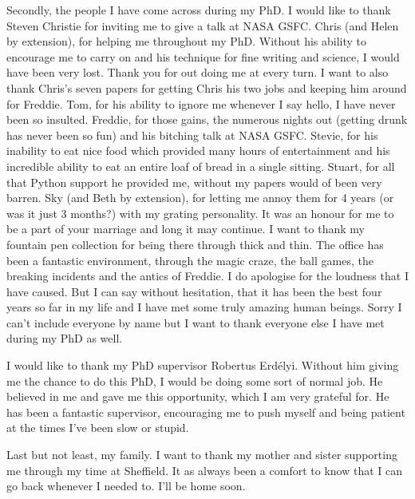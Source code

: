 \begin{acknowledgements}
    Secondly, the people I have come across during my PhD.
    I would like to thank Steven Christie for inviting me to give a talk at NASA GSFC.
    Chris (and Helen by extension), for helping me throughout my PhD.
    Without his ability to encourage me to carry on and his technique for fine writing and science, I would have been very lost.
    Thank you for out doing me at every turn.
    I want to also thank Chris's seven papers for getting Chris his two jobs and keeping him around for Freddie.
    Tom, for his ability to ignore me whenever I say hello, I have never been so insulted.
    Freddie, for those gains, the numerous nights out (getting drunk has never been so fun) and his bitching talk at NASA GSFC.
    Stevie, for his inability to eat nice food which provided many hours of entertainment and his incredible ability to eat an entire loaf of bread in a single sitting. 
    Stuart, for all that Python support he provided me, without my papers would of been very barren.
    Sky (and Beth by extension), for letting me annoy them for 4 years (or was it just 3 months?) with my grating personality.
    It was an honour for me to be a part of your marriage and long it may continue.
    I want to thank my fountain pen collection for being there through thick and thin.
    The office has been a fantastic environment, through the magic craze, the ball games, the breaking incidents and the antics of Freddie. 
    I do apologise for the loudness that I have caused.
    But I can say without hesitation, that it has been the best four years so far in my life and I have met some truly amazing human beings.
    Sorry I can't include everyone by name but I want to thank everyone else I have met during my PhD as well.
        
    I would like to thank my PhD supervisor Robertus Erd\'elyi.
    Without him giving me the chance to do this PhD, I would be doing some sort of normal job.
    He believed in me and gave me this opportunity, which I am very grateful for.
    He has been a fantastic supervisor, encouraging me to push myself and being patient at the times I've been slow or stupid.
    
    Last but not least, my family.
    I want to thank my mother and sister supporting me through my time at Sheffield.
    It as always been a comfort to know that I can go back whenever I needed to.
    I'll be home soon.
    
\end{acknowledgements}